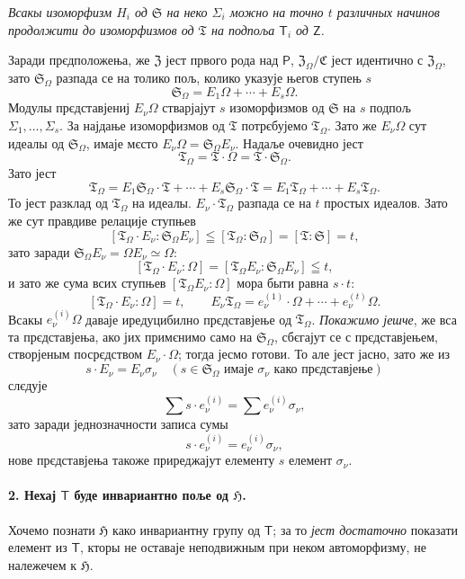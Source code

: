 \documentclass[11pt]{article}
\begin{document}
\emph{Всакы изоморфизм \(H_i\) од \(\mathfrak S\) на неко \(\Sigma_i\) можно на точно \(t\) различных начинов продолжити до изоморфизмов од \(\mathfrak T\) на подпоља \(\mathsf T_i\) од \(\mathsf Z\).}

Заради прєдположења, же \(\mathfrak Z\) јест првого рода над \(\mathsf P\), \(\mathfrak Z_\Omega/\mathfrak C\) јест идентично с \(\mathfrak Z_\Omega\), зато \(\mathfrak S_\Omega\) разпада се на толико пољ, колико указује његов ступењ \(s\)
\[
\mathfrak S_\Omega = E_1\Omega+\cdots+E_s\Omega .
\]
Модулы прєдставјениј \(E_\nu\Omega\) стварјајут \(s\) изоморфизмов од \(\mathfrak S\) на \(s\) подпољ \(\Sigma_1,\ldots,\Sigma_s\). За најдање изоморфизмов од \(\mathfrak T\) потрєбујемо \(\mathfrak T_\Omega\). Зато же \(E_\nu\Omega\) сут идеалы од \(\mathfrak S_\Omega\), имаје мєсто \(E_\nu\Omega=\mathfrak S_\Omega E_\nu\). Надаље очевидно јест
\[
\mathfrak T_\Omega=\mathfrak T\cdot\Omega=\mathfrak T\cdot\mathfrak S_\Omega .
\]
Зато јест
\[
\mathfrak T_\Omega
=E_1\mathfrak S_\Omega\cdot\mathfrak T+\cdots+E_s\mathfrak S_\Omega\cdot\mathfrak T
=E_1\mathfrak T_\Omega+\cdots+E_s\mathfrak T_\Omega .
\]
То јест разклад од \(\mathfrak T_\Omega\) на идеалы. \(E_\nu\cdot\mathfrak T_\Omega\) разпада се на \(t\) простых идеалов. Зато же сут правдиве релације ступњев
\[
[\mathfrak T_\Omega\cdot E_\nu:\mathfrak S_\Omega E_\nu]
\leqq [\mathfrak T_\Omega:\mathfrak S_\Omega]=[\mathfrak T:\mathfrak S]=t,
\]
зато заради \(\mathfrak S_\Omega E_\nu=\Omega E_\nu\simeq\Omega\):
\[
[\mathfrak T_\Omega\cdot E_\nu:\Omega]
=[\mathfrak T_\Omega E_\nu:\mathfrak S_\Omega E_\nu]\leqq t,
\]
и зато же сума всих ступњев \([\mathfrak T_\Omega E_\nu:\Omega]\) мора быти равна \(s\cdot t\):
\[
[\mathfrak T_\Omega\cdot E_\nu:\Omega]=t,\qquad
E_\nu\mathfrak T_\Omega=e_\nu^{(1)}\cdot\Omega+\cdots+e_\nu^{(t)}\Omega .
\]
Всакы \(e_\nu^{(i)}\Omega\) даваје иредуцибилно прєдставјење од \(\mathfrak T_\Omega\). \emph{Покажимо јешче}, же вса та прєдставјења, ако јих примєнимо само на \(\mathfrak S_\Omega\), сбєгајут се с прєдставјењем, створјеным посрєдством \(E_\nu\cdot\Omega\); тогда јесмо готови. То але јест јасно, зато же из
\[
s\cdot E_\nu=E_\nu\sigma_\nu\quad
(s\in\mathfrak S_\Omega\text{ имаје }\sigma_\nu\text{ како прєдставјење})
\]
слєдује
\[
\sum s\cdot e_\nu^{(i)}=\sum e_\nu^{(i)}\sigma_\nu,
\]
зато заради једнозначности записа сумы
\[
s\cdot e_\nu^{(i)}=e_\nu^{(i)}\sigma_\nu,
\]
нове прєдставјења такоже приреджајут елементу \(s\) елемент \(\sigma_\nu\).

\paragraph{2. Нехај \(\mathsf T\) буде инвариантно поље од \(\mathfrak H\).}
Хочемо познати \(\mathfrak H\) како инвариантну групу од \(\mathsf T\); за то \emph{јест достаточно} показати елемент из \(\mathsf T\), кторы не оставаје неподвижным при неком автоморфизму, не належечем к \(\mathfrak H\).
\end{document}
